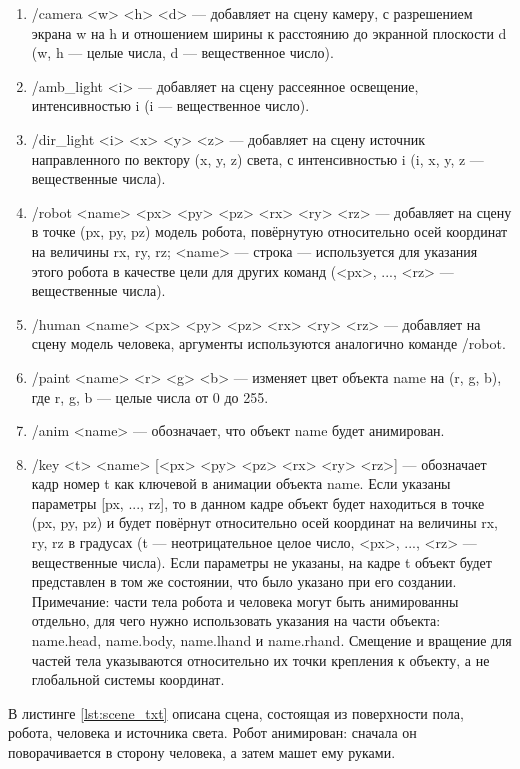 \begin{enumerate}
	\item /camera <w> <h> <d> --- добавляет на сцену камеру, с разрешением экрана w на h и отношением ширины к расстоянию до экранной плоскости d (w, h --- целые числа, d --- вещественное число).
	\item /amb\_light <i> --- добавляет на сцену рассеянное освещение, интенсивностью i (i --- вещественное число).
	\item /dir\_light <i> <x> <y> <z> --- добавляет на сцену источник направленного по вектору (x, y, z) света, с интенсивностью i (i, x, y, z --- вещественные числа).
	\item /robot <name> <px> <py> <pz> <rx> <ry> <rz> --- добавляет на сцену  в точке (px, py, pz) модель робота, повёрнутую относительно осей координат на величины rx, ry, rz; <name> --- строка --- используется для указания этого робота в качестве цели для других команд (<px>, ..., <rz> --- вещественные числа).
	\item /human <name> <px> <py> <pz> <rx> <ry> <rz> --- добавляет на сцену модель человека, аргументы используются аналогично команде /robot.
	\item /paint <name> <r> <g> <b> --- изменяет цвет объекта name на (r, g, b), где r, g, b --- целые числа от 0 до 255.
	\item /anim <name> --- обозначает, что объект name будет анимирован. 
	\item /key <t> <name> [<px> <py> <pz> <rx> <ry> <rz>] --- обозначает кадр номер t как ключевой в анимации объекта name. Если указаны параметры [px, ..., rz], то в данном кадре объект будет находиться в точке (px, py, pz) и будет повёрнут относительно осей координат на величины rx, ry, rz в градусах (t --- неотрицательное целое число, <px>, ..., <rz> --- вещественные числа). Если параметры не указаны, на кадре t объект будет представлен в том же состоянии, что было указано при его создании. Примечание: части тела робота и человека могут быть анимированны отдельно, для чего нужно использовать указания на части объекта: name.head, name.body, name.lhand и name.rhand. Смещение и вращение для частей тела указываются относительно их точки крепления к объекту, а не глобальной системы координат.

\end{enumerate}

В листинге \ref{lst:scene_txt} описана сцена, состоящая из поверхности пола, робота, человека и источника света. Робот анимирован: сначала он поворачивается в сторону человека, а затем машет ему руками.


